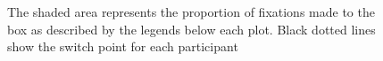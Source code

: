 \documentclass[12pt]{article}
\begin{document}
\begin{figure}
	\centering
	\captionsetup{justification=centering}
	\quad
	\caption{The shaded area represents the proportion of fixations made to the box as described by the legends below each plot. Black dotted lines show the switch point for each participant}
	\label{fig:Session2-prob-props}
\end{figure}

\end{document}
